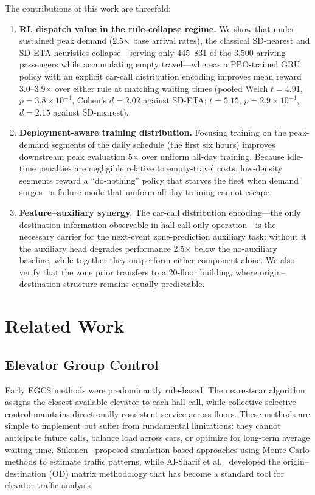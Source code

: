 \documentclass[conference]{IEEEtran}
\begin{document}
The contributions of this work are threefold:
\begin{enumerate}
    \item \textbf{RL dispatch value in the rule-collapse regime.}
    We show that under sustained peak demand (2.5$\times$ base
    arrival rates), the classical SD-nearest and SD-ETA heuristics
collapse---serving only 445--831 of the 3{,}500 arriving passengers
    while accumulating empty travel---whereas a PPO-trained GRU policy
    with an explicit car-call distribution encoding improves mean
    reward 3.0--3.9$\times$ over either rule at matching waiting times
    (pooled Welch
    $t = 4.91$, $p = 3.8\times10^{-4}$, Cohen's $d = 2.02$ against
    SD-ETA; $t = 5.15$, $p = 2.9\times10^{-4}$, $d = 2.15$ against
    SD-nearest).
    \item \textbf{Deployment-aware training distribution.} Focusing
    training on the peak-demand segments of the daily schedule (the
    first six hours) improves downstream peak evaluation 5$\times$
    over uniform all-day training. Because idle-time penalties are
    negligible relative to empty-travel costs, low-density segments
    reward a ``do-nothing'' policy that starves the fleet when demand
    surges---a failure mode that uniform all-day training cannot
    escape.
    \item \textbf{Feature--auxiliary synergy.} The car-call
    distribution encoding---the only destination information
    observable in hall-call-only operation---is the necessary
    carrier for the next-event zone-prediction auxiliary task:
    without it the auxiliary head degrades performance
    2.5$\times$ below the no-auxiliary baseline, while together they
    outperform either component alone. We also verify that the zone
    prior transfers to a 20-floor building, where origin--
    destination structure remains equally predictable.
\end{enumerate}

\section{Related Work}
\label{sec:related}

\subsection{Elevator Group Control}

Early EGCS methods were predominantly rule-based. The nearest-car
algorithm~\cite{barney2003elevator} assigns the closest available
elevator to each hall call, while collective selective control
maintains directionally consistent service across floors. These
methods are simple to implement but suffer from fundamental
limitations: they cannot anticipate future calls, balance load
across cars, or optimize for long-term average waiting time.
Siikonen~\cite{siikonen1997elevator} proposed simulation-based
approaches using Monte Carlo methods to estimate traffic patterns,
while Al-Sharif et al.~\cite{alsharif2020traffic} developed the
origin--destination (OD) matrix methodology that has become a
standard tool for elevator traffic analysis.
\end{document}
